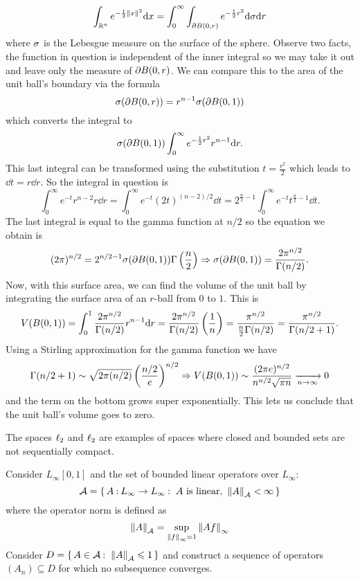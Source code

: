 \documentclass[12pt]{memoir}
\begin{document}
\begin{ptcbr}
\begin{enumerate}[i)]
        $$\int_{\bR^n}e^{-\half\norm{x}^2}\dd x=\int_0^\infty\int_{\del B(0,r)}e^{-\half r^2}\dd\sg\dd r$$
        where $\sigma$ is the Lebesgue measure on the surface of the sphere. Observe two facts, the function in question is independent of the inner integral so we may take it out and leave only the measure of $\partial B(0,r)$. We can compare this to the area of the unit ball's boundary via the formula 
        $$\sigma(\partial B(0,r))=r^{n-1}\sigma(\partial B(0,1))$$
        which converts the integral to 
        $$\sg(\del B(0,1))\int_0^\infty e^{-\half r^2}r^{n-1}\dd r.$$
        This last integral can be transformed using the substitution $t=\frac{r^2}{2}$ which leads to $\dd t= r\dd r$. So the integral in question is 
        $$\int_0^\infty e^{-t}r^{n-2}r\dd r=\int_0^\infty e^{-t}(2t)^{(n-2)/2}\dd t=2^{\frac{n}{2}-1}\int_0^\infty e^{-t}t^{\frac{n}{2}-1}\dd t.$$
        The last integral is equal to the gamma function at $n/2$ so the equation we obtain is 
        $$(2\pi)^{n/2}=2^{n/2-1}\sigma(\partial B(0,1))\Gamma\left(\frac{n}{2}\right)\Rightarrow\sigma(\partial B(0,1))=\frac{2\pi^{n/2}}{\Gamma(n/2)}.$$
        Now, with this surface area, we can find the volume of the unit ball by integrating the surface area of an $r$-ball from $0$ to $1$. This is 
        $$V(B(0,1))=\int_0^1\frac{2\pi^{n/2}}{\Gamma(n/2)}r^{n-1}\dd r=\frac{2\pi^{n/2}}{\Gamma(n/2)}\left(\frac{1}{n}\right)=\frac{\pi^{n/2}}{\frac{n}{2}\Gamma(n/2)}=\frac{\pi^{n/2}}{\Gamma(n/2+1)}.$$
        Using a Stirling approximation for the gamma function we have 
        $$\Gamma(n/2+1)\sim\sqrt{2\pi(n/2)}\left(\frac{n/2}{e}\right)^{n/2}\Rightarrow V(B(0,1))\sim \frac{(2\pi e)^{n/2}}{n^{n/2}\sqrt{\pi n}}\xrightarrow[n\to\infty]{}0$$
        and the term on the bottom grows super exponentially. This lets us conclude that the unit ball's volume goes to zero.
    \end{enumerate}
\end{ptcbr}

\begin{Ej}
    The spaces $\ell_2$ and $\ell_2$ are examples of spaces where closed and bounded sets are not sequentially compact.\par 
    Consider $L_\infty[0,1]$ and the set of bounded linear operators over $L_\infty$: 
    $$\cA=\set{A\: L_\infty\to L_\infty\:\ A\ \text{is linear},\ \norm{A}_\cA<\infty}$$
    where the operator norm is defined as 
    $$\norm{A}_{\mathcal{A}}=\sup_{\norm{f}_{\infty}=1}\norm{Af}_{\infty}$$
    Consider $D=\{\,A\in\mathcal{A}\mathbin{:}\ \norm{A}_{\mathcal{A}}\leqslant 1\,\}$ and construct a sequence of operators $(A_n)\subseteq D$ for which no subsequence converges.
\end{Ej}
\end{document}
